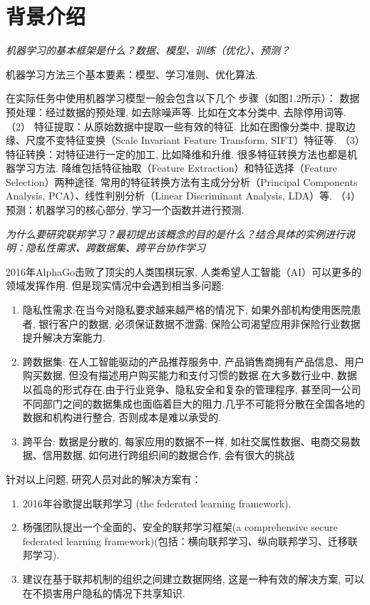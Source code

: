\documentclass[a4paper]{article}
\theoremstyle{definition}
\numberwithin{equation}{section}
\begin{document}
\section{背景介绍}

\emph{机器学习的基本框架是什么？数据、模型、训练（优化）、预测？}

机器学习方法三个基本要素：模型、学习准则、优化算法.

在实际任务中使用机器学习模型一般会包含以下几个
步骤（如图1.2所示）：
数据预处理：经过数据的预处理, 如去除噪声等. 比如在文本分类中, 去除停用词等.
（2） 特征提取：从原始数据中提取一些有效的特征. 比如在图像分类中, 提取边缘、尺度不变特征变换（Scale Invariant Feature Transform, SIFT）特征等.
（3） 特征转换：对特征进行一定的加工, 比如降维和升维. 很多特征转换方法也都是机器学习方法.
降维包括特征抽取（Feature Extraction）和特征选择（Feature Selection）两种途径. 常用的特征转换方法有主成分分析（Principal Components Analysis, PCA）、线性判别分析（Linear Discriminant Analysis, LDA）等.
（4） 预测：机器学习的核心部分, 学习一个函数并进行预测.




\emph{为什么要研究联邦学习？最初提出该概念的目的是什么？结合具体的实例进行说明：隐私性需求、跨数据集、跨平台协作学习}

2016年AlphaGo击败了顶尖的人类围棋玩家,  人类希望人工智能（AI）可以更多的领域发挥作用. 
但是现实情况中会遇到相当多问题:   
\begin{enumerate}
    \item 隐私性需求:在当今对隐私要求越来越严格的情况下, 如果外部机构使用医院患者, 银行客户的数据, 必须保证数据不泄露; 保险公司渴望应用非保险行业数据提升解决方案能力.
    \item 跨数据集: 在人工智能驱动的产品推荐服务中, 产品销售商拥有产品信息、用户购买数据, 但没有描述用户购买能力和支付习惯的数据.在大多数行业中, 数据以孤岛的形式存在.由于行业竞争、隐私安全和复杂的管理程序, 甚至同一公司不同部门之间的数据集成也面临着巨大的阻力.几乎不可能将分散在全国各地的数据和机构进行整合, 否则成本是难以承受的.
    \item 跨平台: 数据是分散的, 每家应用的数据不一样,  如社交属性数据、电商交易数据、信用数据,  如何进行跨组织间的数据合作, 会有很大的挑战

    
\end{enumerate} 
 
 
针对以上问题, 研究人员对此的解决方案有：
\citep{yang2019federated}
\begin{enumerate}    
\item 2016年谷歌提出联邦学习 (the federated learning framework).
\citep{brendan2016communication}
\item 杨强团队提出一个全面的、安全的联邦学习框架(a comprehensive secure federated learning framework)(包括：横向联邦学习、纵向联邦学习、迁移联邦学习).
\item 建议在基于联邦机制的组织之间建立数据网络, 这是一种有效的解决方案, 可以在不损害用户隐私的情况下共享知识.  
\end{enumerate} 
\end{document}
